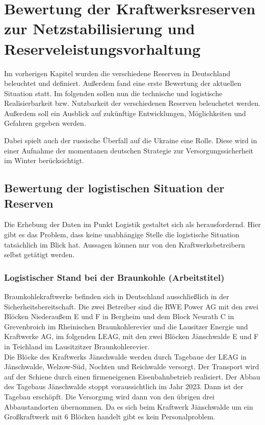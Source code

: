 \section{Bewertung der Kraftwerksreserven zur Netzstabilisierung und Reserveleistungsvorhaltung}

Im vorherigen Kapitel wurden die verschiedene Reserven in Deutschland beleuchtet und definiert. Außerdem fand eine erste Bewertung der aktuellen Situation statt. Im folgenden sollen nun die technische und logistische Realisierbarkeit bzw. Nutzbarkeit der verschiedenen Reserven beleuchetet werden. Außerdem soll ein Ausblick auf zukünftige Entwicklungen, Möglichkeiten und Gefahren gegeben werden.

Dabei spielt auch der russische Überfall auf die Ukraine eine Rolle. Diese wird in einer Aufnahme der momentanen deutschen Strategie zur Versorgungssicherheit im Winter berücksichtigt.

	\subsection{Bewertung der logistischen Situation der Reserven}
	Die Erhebung der Daten im Punkt Logistik gestaltet sich als herausfordernd. Hier gibt es das Problem, dass keine unabhängige Stelle die logistische Situation tatsächlich im Blick hat. Aussagen können nur von den Kraftwerksbetreibern selbst getätigt werden.
	
		\subsubsection{Logistischer Stand bei der Braunkohle (Arbeitstitel)} \label{sect: Braunkohle}
	Braunkohlekraftwerke befinden sich in Deutschland ausschließlich in der Sicherheitsbereitschaft. Die zwei Betreiber sind die RWE Power AG mit den zwei Blöcken Niederaußem E und F in Bergheim und dem Block Neurath C in Grevenbroich im Rheinischen Braunkohlerevier und die Lausitzer Energie und Kraftwerke AG, im folgenden LEAG, mit den zwei Blöcken Jänschwalde E und F in Teichland im Lausitzitzer Braunkohlerevier. \cite{Excel_Kraftwerksliste} \\
	
	Die Blöcke des Kraftwerks Jänschwalde werden durch Tagebaue der LEAG in Jänschwalde, Welzow-Süd, Nochten und Reichwalde versorgt. Der Transport wird auf der Schiene durch einen firmeneigenen Eisenbahnbetrieb realisiert. Der Abbau des Tagebaus Jänschwalde stoppt voraussichtlich im Jahr 2023. Dann ist der Tagebau erschöpft. Die Versorgung wird dann von den übrigen drei Abbaustandorten übernommen.
	Da es sich beim Kraftwerk Jänschwalde um ein Großkraftwerk mit 6 Blöcken handelt gibt es kein Personalproblem.\cite{LEAG_Braunkohleversorgung} \\
	
